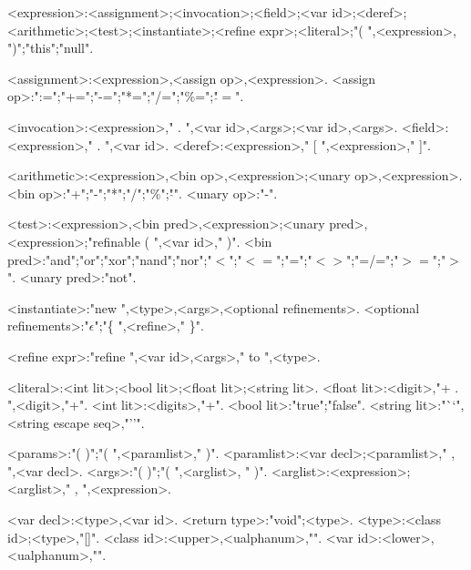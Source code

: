 \begin{grammar}
<expression>:<assignment>;<invocation>;<field>;<var id>;<deref>;<arithmetic>;<test>;<instantiate>;<refine expr>;<literal>;"( ",<expression>, ")";"this";"null".

<assignment>:<expression>,<assign op>,<expression>.
<assign op>:":=";"+=";"-=";"*=";"/=";"\%=";"$\hat{}=$".

<invocation>:<expression>," . ",<var id>,<args>;<var id>,<args>.
<field>:<expression>," . ",<var id>.
<deref>:<expression>," [ ",<expression>," ]".

<arithmetic>:<expression>,<bin op>,<expression>;<unary op>,<expression>.
<bin op>:"+";"-";"*";"/";"\%";"$\hat{}$".
<unary op>:"-".

<test>:<expression>,<bin pred>,<expression>;<unary pred>,<expression>;"refinable ( ",<var id>," )".
<bin pred>:"and";"or";"xor";"nand";"nor";"$<$";"$<=$";"=";"$<>$";"=/=";"$>=$";"$>$".
<unary pred>:"not".

<instantiate>:"new ",<type>,<args>,<optional refinements>.
<optional refinements>:"$\epsilon$";"\{ ",<refine>,"{\small *} \}".

<refine expr>:"refine ",<var id>,<args>," to ",<type>.

<literal>:<int lit>;<bool lit>;<float lit>;<string lit>.
<float lit>:<digit>,"{\small +} . ",<digit>,"{\small +}".
<int lit>:<digits>,"{\small +}".
<bool lit>:"true";"false".
<string lit>:"``",<string escape seq>,"''".

<params>:"( )";"( ",<paramlist>," )".
<paramlist>:<var decl>;<paramlist>," , ",<var decl>.
<args>:"( )";"( ",<arglist>, " )".
<arglist>:<expression>;<arglist>," , ",<expression>.

<var decl>:<type>,<var id>.
<return type>:"void";<type>.
<type>:<class id>;<type>,"[]".
<class id>:<upper>,<ualphanum>,"{\small *}".
<var id>:<lower>,<ualphanum>,"{\small *}".

\end{grammar}
